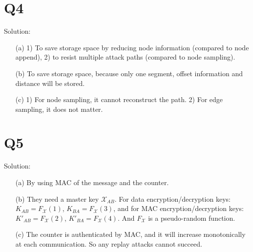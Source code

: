 \documentclass[12pt,letterpaper]{article}
\begin{document}
\section{Q4}
Solution:
\begin{itemize}
 \item[(a)] 1) To save storage space by reducing node information (compared
 to node append), 2) to resist multiple attack paths (compared to node sampling).
 \item[(b)] To save storage space, because only one segment, offset information
 and distance will be stored.
 \item[(c)] 1) For node sampling, it cannot reconstruct the path. 2) For edge
 sampling, it does not matter.
\end{itemize}

\section{Q5}
Solution:
\begin{itemize}
 \item[(a)] By using MAC of the message and the counter.
 \item[(b)] They need a master key $\mathcal{X}_{AB}$. For data encryption/decryption
 keys: $K_{AB} = F_\mathcal{X}(1)$, $K_{BA} = F_\mathcal{X}(3)$, and for MAC
 encryption/decryption keys: $K'_{AB} = F_\mathcal{X}(2)$, $K'_{BA} = F_\mathcal{X}(4)$.
 And $F_\mathcal{X}$ is a pseudo-random function.
 \item[(c)] The counter is authenticated by MAC, and it will increase monotonically 
 at each communication. So any replay attacks cannot succeed.
\end{itemize}
\end{document}
